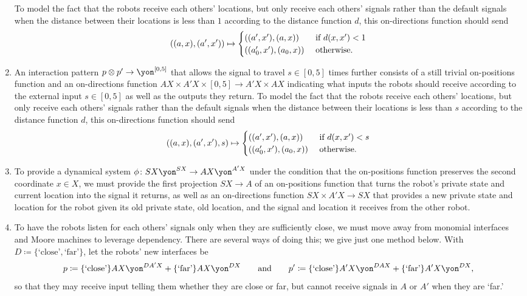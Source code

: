 \documentclass[Book-Poly]{subfiles}
\begin{document}
\begin{exercise}
\begin{solution}
\begin{enumerate}
    To model the fact that the robots receive each others' locations, but only receive each others' signals rather than the default signals when the distance between their locations is less than $1$ according to the distance function $d$, this on-directions function should send
    \[
        ((a,x),(a',x'))\mapsto
          \begin{cases}
          	((a',x'),(a,x))&\textnormal{ if }d(x,x')<1\\
          	((a'_0,x'),(a_0,x))&\textnormal{ otherwise}.
          \end{cases}
    \]
    \item An interaction pattern $p\otimes p'\to\yon^{[0,5]}$ that allows the signal to travel $s\in[0,5]$ times further consists of a still trivial on-positions function and an on-directions function $AX\times A'X\times[0,5]\to A'X\times AX$ indicating what inputs the robots should receive according to the external input $s\in[0,5]$ as well as the outputs they return.
    To model the fact that the robots receive each others' locations, but only receive each others' signals rather than the default signals when the distance between their locations is less than $s$ according to the distance function $d$, this on-directions function should send
    \[
        ((a,x),(a',x'),s)\mapsto
          \begin{cases}
          	((a',x'),(a,x))&\textnormal{ if }d(x,x')<s\\
          	((a'_0,x'),(a_0,x))&\textnormal{ otherwise}.
          \end{cases}
    \]
    \item To provide a dynamical system $\phi\colon SX\yon^{SX}\to AX\yon^{A'X}$ under the condition that the on-positions function preserves the second coordinate $x\in X$, we must provide the first projection $SX\to A$ of an on-positions function that turns the robot's private state and current location into the signal it returns, as well as an on-directions function $SX\times A'X\to SX$ that provides a new private state and location for the robot given its old private state, old location, and the signal and location it receives from the other robot.
    
    \item To have the robots listen for each others' signals only when they are sufficiently close, we must move away from monomial interfaces and Moore machines to leverage dependency.
    There are several ways of doing this; we give just one method below.
    With $D\coloneqq\{\text{`close'},\text{`far'}\}$, let the robots' new interfaces be
    \[
        p\coloneqq \{\text{`close'}\}AX\yon^{DA'X}+\{\text{`far'}\}AX\yon^{DX} \qqand p'\coloneqq \{\text{`close'}\}A'X\yon^{DAX}+\{\text{`far'}\}A'X\yon^{DX},
    \]
    so that they may receive input telling them whether they are close or far, but cannot receive signals in $A$ or $A'$ when they are `far.'
    

\end{enumerate}
\end{solution}
\end{exercise}
\end{document}
